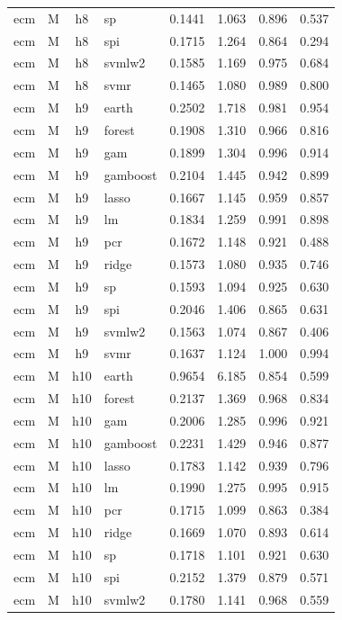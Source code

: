 \begin{ThreePartTable}
\begin{longtable}[t]{llclcccc}
ecm & M & h8 & sp & 0.1441 & 1.063 & 0.896 & 0.537\\
ecm & M & h8 & spi & 0.1715 & 1.264 & 0.864 & 0.294\\
ecm & M & h8 & svmlw2 & 0.1585 & 1.169 & 0.975 & 0.684\\
ecm & M & h8 & svmr & 0.1465 & 1.080 & 0.989 & 0.800\\
\addlinespace
ecm & M & h9 & earth & 0.2502 & 1.718 & 0.981 & 0.954\\
ecm & M & h9 & forest & 0.1908 & 1.310 & 0.966 & 0.816\\
ecm & M & h9 & gam & 0.1899 & 1.304 & 0.996 & 0.914\\
ecm & M & h9 & gamboost & 0.2104 & 1.445 & 0.942 & 0.899\\
ecm & M & h9 & lasso & 0.1667 & 1.145 & 0.959 & 0.857\\
ecm & M & h9 & lm & 0.1834 & 1.259 & 0.991 & 0.898\\
ecm & M & h9 & pcr & 0.1672 & 1.148 & 0.921 & 0.488\\
ecm & M & h9 & ridge & 0.1573 & 1.080 & 0.935 & 0.746\\
ecm & M & h9 & sp & 0.1593 & 1.094 & 0.925 & 0.630\\
ecm & M & h9 & spi & 0.2046 & 1.406 & 0.865 & 0.631\\
ecm & M & h9 & svmlw2 & 0.1563 & 1.074 & 0.867 & 0.406\\
ecm & M & h9 & svmr & 0.1637 & 1.124 & 1.000 & 0.994\\
\addlinespace
ecm & M & h10 & earth & 0.9654 & 6.185 & 0.854 & 0.599\\
ecm & M & h10 & forest & 0.2137 & 1.369 & 0.968 & 0.834\\
ecm & M & h10 & gam & 0.2006 & 1.285 & 0.996 & 0.921\\
ecm & M & h10 & gamboost & 0.2231 & 1.429 & 0.946 & 0.877\\
ecm & M & h10 & lasso & 0.1783 & 1.142 & 0.939 & 0.796\\
ecm & M & h10 & lm & 0.1990 & 1.275 & 0.995 & 0.915\\
ecm & M & h10 & pcr & 0.1715 & 1.099 & 0.863 & 0.384\\
ecm & M & h10 & ridge & 0.1669 & 1.070 & 0.893 & 0.614\\
ecm & M & h10 & sp & 0.1718 & 1.101 & 0.921 & 0.630\\
ecm & M & h10 & spi & 0.2152 & 1.379 & 0.879 & 0.571\\
ecm & M & h10 & svmlw2 & 0.1780 & 1.141 & 0.968 & 0.559\\

\end{longtable}
\end{ThreePartTable}
